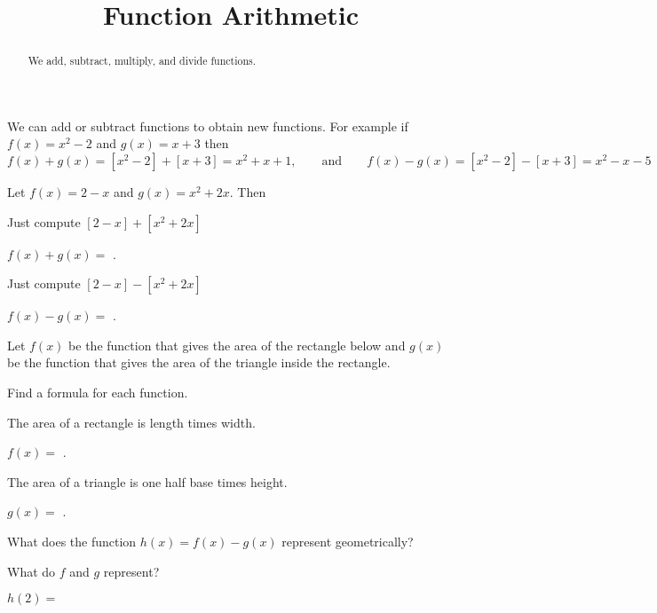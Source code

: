 \documentclass{ximera}
\title{Function Arithmetic}
\begin{document}
\begin{abstract}
We add, subtract, multiply, and divide functions.
\end{abstract}
\maketitle


We can add or subtract functions to obtain new functions. For example if $f(x)=x^2-2$ and $g(x)=x+3$ then 
\[
f(x)+g(x)=[x^2-2]+[x+3]=x^2+x+1,\qquad\text{and}\qquad f(x)-g(x)=[x^2-2]-[x+3]=x^2-x-5
\]

\begin{question}
Let $f(x)=2-x$ and $g(x)=x^2+2x$. Then
\begin{solution}
\begin{hint}
Just compute $[2-x]+[x^2+2x]$
\end{hint}
$f(x)+g(x)=$ .

\begin{hint}
Just compute $[2-x]-[x^2+2x]$
\end{hint}
$f(x)-g(x)=$ .
\end{solution}
\end{question}

\begin{question}
Let $f(x)$ be the function that gives the area of the rectangle below and $g(x)$ be the function that gives the area of the triangle inside the rectangle. 
\begin{image}
\end{image}

Find a formula for each function.

\begin{solution}
\begin{hint}
The area of a rectangle is length times width.
\end{hint}
$f(x)=$ .

\begin{hint}
The area of a triangle is one half base times height.
\end{hint}
$g(x)=$ .

What does the function $h(x)=f(x)-g(x)$ represent geometrically?
\begin{multiple-choice}
\end{multiple-choice}
\begin{hint}
What do $f$ and $g$ represent? 
\end{hint}

$h(2)=$ 
\end{solution}
\end{question}
\end{document}
